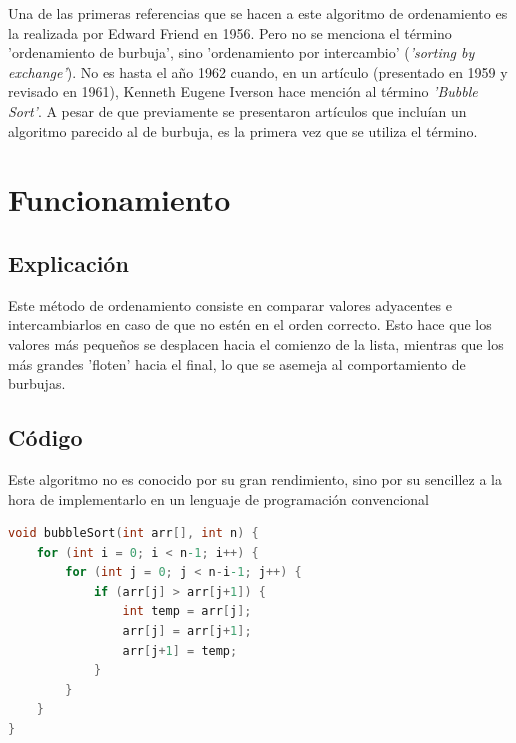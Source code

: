 \documentclass[conference, a4paper]{IEEEtran}
\begin{document}
Una de las primeras referencias que se hacen a este algoritmo de ordenamiento es la realizada por Edward Friend en 1956. Pero no se menciona el término 'ordenamiento de burbuja', sino 'ordenamiento por intercambio' (\textit{'sorting by exchange'}). No es hasta el año 1962 cuando, en un artículo (presentado en 1959 y revisado en 1961), Kenneth Eugene Iverson hace mención al término \textit{'Bubble Sort'}. A pesar de que previamente se presentaron artículos que incluían un algoritmo parecido al de burbuja, es la primera vez que se utiliza el término. {\cite{owen_bubblesort}}

\section{Funcionamiento}

\subsection{Explicación}
Este método de ordenamiento consiste en comparar valores adyacentes e intercambiarlos en caso de que no estén en el orden correcto. Esto hace que los valores más pequeños se desplacen hacia el comienzo de la lista, mientras que los más grandes 'floten' hacia el final, lo que se asemeja al comportamiento de burbujas. {\cite{geeksforgeeks_bubble_sort}}\cite{WengrowJay2020ACGt}

\subsection{Código}
Este algoritmo no es conocido por su gran rendimiento, sino por su sencillez a la hora de implementarlo en un lenguaje de programación convencional
\begin{lstlisting}[language=C, caption={Bubble Sort en C}, label={lst:bubblec}]
void bubbleSort(int arr[], int n) {
    for (int i = 0; i < n-1; i++) {
        for (int j = 0; j < n-i-1; j++) {
            if (arr[j] > arr[j+1]) {
                int temp = arr[j];
                arr[j] = arr[j+1];
                arr[j+1] = temp;
            }
        }
    }
}
\end{lstlisting}
\end{document}
